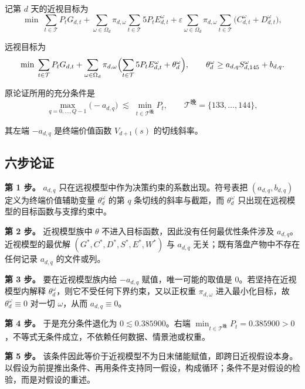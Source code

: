 \begin{appendices}
记第 $d$ 天的近视目标为
\begin{equation}
\min\;\sum_{t\in\mathcal{T}}P_tG_{d,t}+\sum_{\omega\in\Omega_d}\pi_{d,\omega}\sum_{t\in\mathcal{T}}5P_tE^\omega_{d,t}
+\varepsilon\sum_{\omega\in\Omega_d}\pi_{d,\omega}\sum_{t\in\mathcal{T}}\bigl(C^\omega_{d,t}+D^\omega_{d,t}\bigr),
\end{equation}

远视目标为
\begin{equation}
\min\;\sum_{t\in\mathcal{T}}P_tG_{d,t}+\sum_{\omega\in\Omega_d}\pi_{d,\omega}\Bigl(\sum_{t\in\mathcal{T}}5P_tE^\omega_{d,t}+\theta^\omega_d\Bigr),
\qquad \theta^\omega_d\ge a_{d,q}S^\omega_{d,145}+b_{d,q}.
\end{equation}

原论证所用的充分条件是
\begin{equation}
\max_{q=0,\ldots,Q-1}\bigl(-a_{d,q}\bigr)\;\lesssim\;\min_{t\in\mathcal{T}^{\text{晚}}}P_t,
\qquad \mathcal{T}^{\text{晚}}=\{133,\ldots,144\},
\end{equation}

其左端 $-a_{d,q}$ 是终端价值函数 $V_{d+1}(s)$ 的切线斜率。

\subsection{六步论证}

\textbf{第 1 步。} $a_{d,q}$ 只在远视模型中作为决策约束的系数出现。符号表把 $(a_{d,q},b_{d,q})$ 定义为终端价值辅助变量 $\theta^\omega_d$ 的第 $q$ 条切线的斜率与截距，而 $\theta^\omega_d$ 只出现在远视模型的目标函数与支撑约束中。

\textbf{第 2 步。} 近视模型族中 $\theta$ 不进入目标函数，因此没有任何最优性条件涉及 $a_{d,q}$。近视模型的最优解 $(G^*,C^*,D^*,S^*,E^*,W^*)$ 与 $a_{d,q}$ 无关；既有落盘产物中不存在任何记录 $a_{d,q}$ 的文件或列。

\textbf{第 3 步。} 要在近视模型族内给 $-a_{d,q}$ 赋值，唯一可能的取值是 0。若坚持在近视模型内解释 $\theta^\omega_d$，则它不受任何下界约束，又以正权重 $\pi_{d,\omega}$ 进入最小化目标，故 $\theta^\omega_d\equiv0$ 对一切 $\omega$，从而 $a_{d,q}\equiv0$。

\textbf{第 4 步。} 于是充分条件退化为 $0\lesssim0.385900$。右端 $\min_{t\in\mathcal{T}^{\text{晚}}}P_t=0.385900>0$，不等式无条件成立，不依赖任何数据、情景池或权重。

\textbf{第 5 步。} 该条件因此等价于近视模型不为日末储能赋值，即跨日近视假设本身。以假设为前提推出条件、再用条件支持同一假设，构成循环；条件不是对假设的检验，而是对假设的重述。


\end{appendices}
